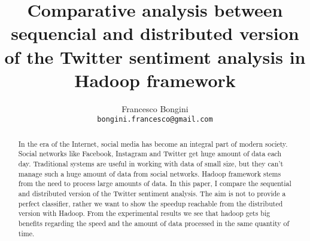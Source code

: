 \documentclass[10pt,twocolumn,letterpaper]{article}
\begin{document}
\title{Comparative analysis between sequencial and distributed version of the Twitter sentiment analysis in Hadoop framework}

\author{Francesco Bongini\\
\tt\small bongini.francesco@gmail.com}

\maketitle
\thispagestyle{empty}

\begin{abstract}

In the era of the Internet, social media has become an integral part of modern society. Social networks like Facebook, Instagram and Twitter get huge amount of data each day. Traditional systems are useful in working with data of small size, but they can’t manage such a huge amount of data from social networks.
Hadoop framework stems from the need to process large amounts of data.
In this paper, I compare the sequential and distributed version of the Twitter sentiment analysis. The aim is not to provide a perfect classifier, rather we want to show the speedup reachable from the distributed version with Hadoop. From the experimental results we see that hadoop gets big benefits regarding the speed and the
amount of data processed in the same quantity of time.

 
\end{abstract}
\end{document}
